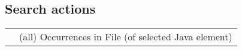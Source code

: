 \subsection{Search actions}
\begin{tabularx}{\linewidth}{@{}lX@{}}
	\keys{\ctrl + \shift + U}&		(all) Occurrences in File (of selected Java element)\\
\end{tabularx}
